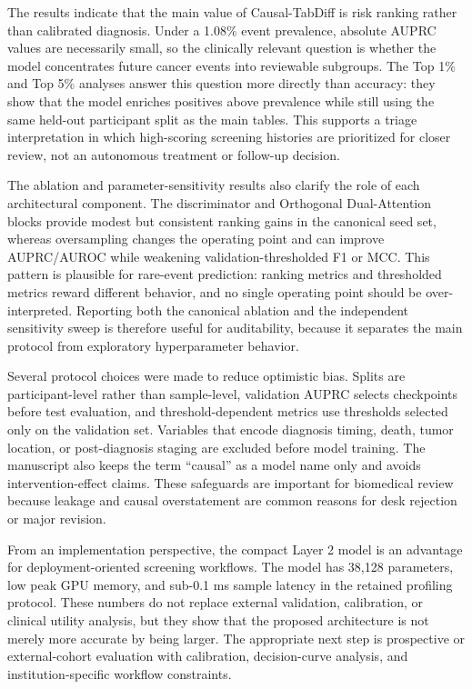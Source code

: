 \documentclass[11pt,journal,twoside]{IEEEtran}
\begin{document}
The results indicate that the main value of Causal-TabDiff is risk ranking rather than calibrated diagnosis. Under a 1.08\% event prevalence, absolute AUPRC values are necessarily small, so the clinically relevant question is whether the model concentrates future cancer events into reviewable subgroups. The Top 1\% and Top 5\% analyses answer this question more directly than accuracy: they show that the model enriches positives above prevalence while still using the same held-out participant split as the main tables. This supports a triage interpretation in which high-scoring screening histories are prioritized for closer review, not an autonomous treatment or follow-up decision.

The ablation and parameter-sensitivity results also clarify the role of each architectural component. The discriminator and Orthogonal Dual-Attention blocks provide modest but consistent ranking gains in the canonical seed set, whereas oversampling changes the operating point and can improve AUPRC/AUROC while weakening validation-thresholded F1 or MCC. This pattern is plausible for rare-event prediction: ranking metrics and thresholded metrics reward different behavior, and no single operating point should be over-interpreted. Reporting both the canonical ablation and the independent sensitivity sweep is therefore useful for auditability, because it separates the main protocol from exploratory hyperparameter behavior.

Several protocol choices were made to reduce optimistic bias. Splits are participant-level rather than sample-level, validation AUPRC selects checkpoints before test evaluation, and threshold-dependent metrics use thresholds selected only on the validation set. Variables that encode diagnosis timing, death, tumor location, or post-diagnosis staging are excluded before model training. The manuscript also keeps the term ``causal'' as a model name only and avoids intervention-effect claims. These safeguards are important for biomedical review because leakage and causal overstatement are common reasons for desk rejection or major revision.

From an implementation perspective, the compact Layer 2 model is an advantage for deployment-oriented screening workflows. The model has 38,128 parameters, low peak GPU memory, and sub-0.1 ms sample latency in the retained profiling protocol. These numbers do not replace external validation, calibration, or clinical utility analysis, but they show that the proposed architecture is not merely more accurate by being larger. The appropriate next step is prospective or external-cohort evaluation with calibration, decision-curve analysis, and institution-specific workflow constraints.
\end{document}
